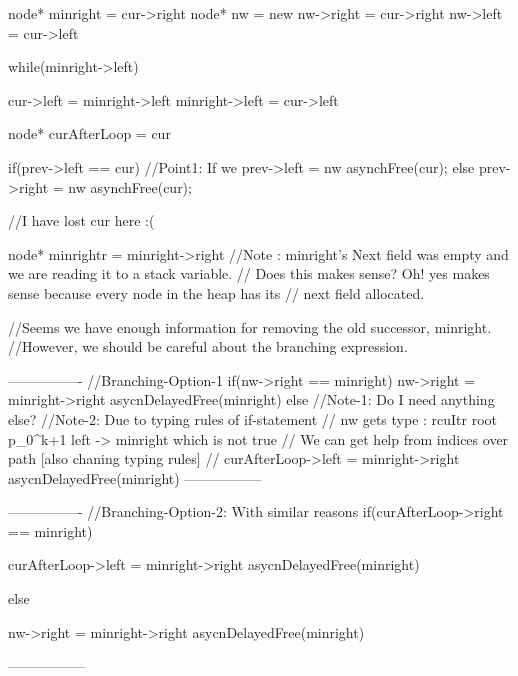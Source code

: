 

node* minright = cur->right
node* nw = new
nw->right = cur->right
nw->left = cur->left




while(minright->left){

  cur->left = minright->left
  minright->left = cur->left

}

node* curAfterLoop = cur


if(prev->left == cur)
{
  //Point1: If we 
  prev->left = nw
  asynchFree(cur);
}
else
{
  prev->right = nw
  asynchFree(cur);
}


//I have lost cur here :(

node* minrightr = minright->right
//Note : minright's Next field was empty and we are reading it to a stack variable.
// Does this makes sense? Oh! yes makes sense because every node in the heap has its
// next field allocated.


//Seems we have enough information for removing the old successor, minright.
//However, we should be careful about the branching expression.

----------------
//Branching-Option-1
if(nw->right == minright){
  nw->right = minright->right
  asycnDelayedFree(minright)
}
else
{
  //Note-1: Do I need anything else?
  //Note-2: Due to typing rules of if-statement
  //        nw gets type : rcuItr root p_{0}^{k+1} {left -> minright} which is not true
  //        We can get help from indices over path [also chaning typing rules] 
  //        
  curAfterLoop->left = minright->right
  asycnDelayedFree(minright)
}
-----------------

----------------
//Branching-Option-2: With similar reasons 
if(curAfterLoop->right == minright){
  
  curAfterLoop->left = minright->right
  asycnDelayedFree(minright)  
}
else
{

  nw->right = minright->right
  asycnDelayedFree(minright)
}

-----------------
